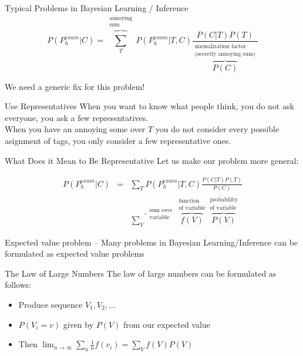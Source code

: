 \documentclass[11pt]{beamer}
\begin{document}
	
	\begin{frame}{Typical Problems in Bayesian Learning / Inference }
		$$P(P_{h}^{exam}|C) = \overbrace{\sum_{T}}^{\substack{\mbox{annoying} \\ \mbox{sum}}} P(P_{h}^{exam}|T,C) \frac{P(C|T)P(T)}{\overbrace{P(C)}^{\substack{\mbox{normalization factor} \\ \mbox{(secretly annoying sum)}}}}$$
		
		\vspace{10pt} We need a generic fix for this problem!
	\end{frame}
	
	\begin{frame}{Use Representatives}
		When you want to know what people think, you do not ask everyone, you ask a few representatives.\\[10pt]
		When you have an annoying some over $T$ you do not consider every possible asignment of tags, you only consider a few representative ones.
	\end{frame}
	
	\begin{frame}{What Does it Mean to Be Representative}
		Let us make our problem more general:
		
		\begin{align*}
			P(P_{h}^{exam}|C) & = & \sum_{T} P(P_{h}^{exam}|T,C) \frac{P(C|T)P(T)}{P(C)} \\
			& & \overbrace{\sum_{V}}^{\substack{\mbox{sum over}\\\mbox{variable}}} \overbrace{f(V)}^{\substack{\mbox{function} \\ \mbox{of variable}}} \overbrace{P(V)}^{\substack{\mbox{probability} \\ \mbox{of variable}}}
		\end{align*}
		
		\vspace{10pt} Expected value problem -- Many problems in Bayesian Learning/Inference can be formulated as expected value problems
	\end{frame}
	
	
	\begin{frame}{The Law of Large Numbers}
		The law of large numbers can be formulated as follows:
		
		\begin{itemize}
			\item Produce sequence $V_1,V_2,\dots$
			\item $P(V_i = v)$ given by $P(V)$ from our expected value
			\item Then $\lim_{n \rightarrow \infty} \sum_{n} \frac{1}{n} f(v_i) = \sum_{V} f(V) P(V)$
		\end{itemize}
	\end{frame}
	
\end{document}
